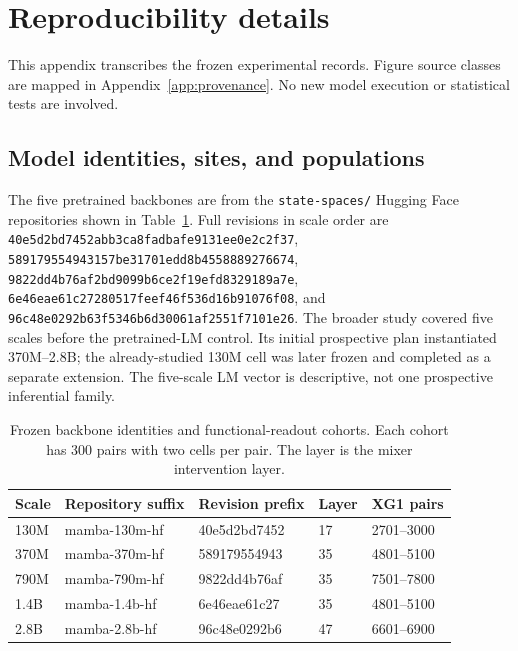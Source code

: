 \section{Reproducibility details}
\label{app:repro}

This appendix transcribes the frozen experimental records. Figure source
classes are mapped in Appendix~\ref{app:provenance}. No new model execution
or statistical tests are involved.

\subsection{Model identities, sites, and populations}
\label{app:identity}

The five pretrained backbones are from the \texttt{state-spaces/} Hugging
Face repositories shown in Table~\ref{tab:identity}. Full revisions in
scale order are \nolinkurl{40e5d2bd7452abb3ca8fadbafe9131ee0e2c2f37},
\nolinkurl{589179554943157be31701edd8b4558889276674},
\nolinkurl{9822dd4b76af2bd9099b6ce2f19efd8329189a7e},
\nolinkurl{6e46eae61c27280517feef46f536d16b91076f08}, and
\nolinkurl{96c48e0292b63f5346b6d30061af2551f7101e26}.
The broader study covered five scales before the pretrained-LM control.
Its initial prospective plan instantiated 370M--2.8B; the already-studied
130M cell was later frozen and completed as a separate extension. The
five-scale LM vector is descriptive, not one prospective inferential family.

\begin{table}[h]
\centering\small
\caption{Frozen backbone identities and functional-readout cohorts. Each
cohort has 300 pairs with two cells per pair. The layer is the mixer
intervention layer.}
\label{tab:identity}
\begin{tabular}{lllll}
\toprule
Scale & Repository suffix & Revision prefix & Layer & XG1 pairs \\
\midrule
130M & mamba-130m-hf & 40e5d2bd7452 & 17 & 2701--3000 \\
370M & mamba-370m-hf & 589179554943 & 35 & 4801--5100 \\
790M & mamba-790m-hf & 9822dd4b76af & 35 & 7501--7800 \\
1.4B & mamba-1.4b-hf & 6e46eae61c27 & 35 & 4801--5100 \\
2.8B & mamba-2.8b-hf & 96c48e0292b6 & 47 & 6601--6900 \\
\bottomrule
\end{tabular}
\end{table}

